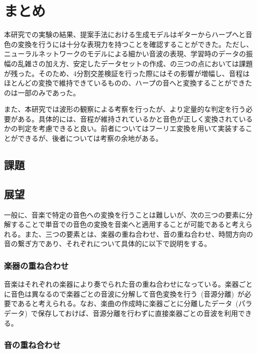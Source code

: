\chapter{まとめ}

本研究での実験の結果、提案手法における生成モデルはギターからハープへと音色の変換を行うには十分な表現力を持つことを確認することができた。ただし、ニューラルネットワークのモデルによる細かい音波の表現、学習時のデータの振幅の乱雑さの加え方、安定したデータセットの作成、の三つの点においては課題が残った。そのため、4分割交差検証を行った際にはその影響が増幅し、音程はほとんどの変換で維持できているものの、ハープの音へと変換することができたのは一部のみであった。

また、本研究では波形の観察による考察を行ったが、より定量的な判定を行う必要がある。具体的には、音程が維持されているかと音色が正しく変換されているかの判定を考慮できると良い。前者についてはフーリエ変換を用いて実装することができるが、後者については考察の余地がある。

\section{課題}


\section{展望}

一般に、音楽で特定の音色への変換を行うことは難しいが、次の三つの要素に分解することで単音での音色の変換を音楽へと適用することが可能であると考えられる。また、三つの要素とは、楽器の重ね合わせ、音の重ね合わせ、時間方向の音の繋ぎ方であり、それぞれについて具体的に以下で説明をする。

\subsection{楽器の重ね合わせ}
    
音楽はそれぞれの楽器により奏でられた音の重ね合わせになっている。楽器ごとに音色は異なるので楽器ごとの音波に分解して音色変換を行う~(音源分離)~が必要であると考えられる。なお、楽曲の作成時に楽器ごとに分離したデータ~(パラデータ)~で保存しておけば、音源分離を行わずに直接楽器ごとの音波を利用できる。

\subsection{音の重ね合わせ}

